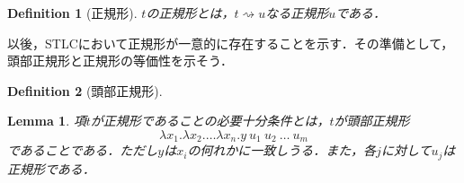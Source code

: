 \documentclass[a4paper,10pt,platex]{jsarticle}
\newtheorem{definition}{Definition}
\newtheorem{lemma}{Lemma}
\begin{document}
\begin{definition}[正規形]
    $t$の正規形とは，$t\rightsquigarrow u$なる正規形$u$である．
\end{definition}
以後，STLCにおいて正規形が一意的に存在することを示す．その準備として，頭部正規形と正規形の等価性を示そう．
\begin{definition}[頭部正規形]

\end{definition}
\begin{lemma}
項$t$が正規形であることの必要十分条件とは，$t$が\emph{頭部正規形}\begin{equation}
    \lambda x_{1}.\lambda x_{2}.\ldots \lambda x_{n}. y\ u_{1}\ u_{2}\ \ldots\ u_{m}
\end{equation}であることである．ただし$y$は$x_{i}$の何れかに一致しうる．また，各$j$に対して$u_{j}$は正規形である．
\end{lemma}
\end{document}
